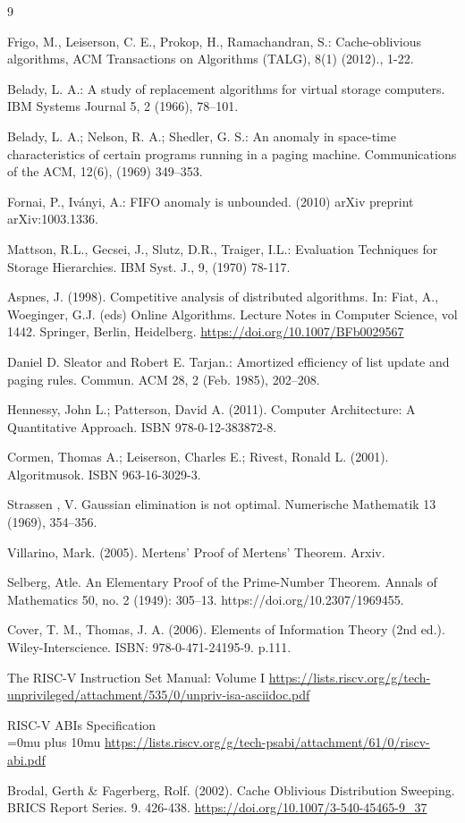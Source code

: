 \documentclass[12pt]{report}
\begin{document}
\begin{thebibliography}{9}

Frigo, M., Leiserson, C. E., Prokop, H., Ramachandran, S.: Cache-oblivious algorithms, ACM Transactions on Algorithms (TALG), 8(1)  (2012)., 1-22.

Belady, L. A.: A study of replacement algorithms for virtual storage computers. IBM Systems Journal 5, 2 (1966), 78–101.

Belady, L. A.; Nelson, R. A.; Shedler, G. S.: An anomaly in space-time characteristics of certain programs running in a paging machine. Communications of the ACM, 12(6), (1969) 349–353. 

Fornai, P., Iványi, A.: FIFO anomaly is unbounded.  (2010) arXiv preprint arXiv:1003.1336.

Mattson, R.L., Gecsei, J., Slutz, D.R., Traiger, I.L.: Evaluation Techniques for Storage Hierarchies. IBM Syst. J., 9, (1970) 78-117.

Aspnes, J. (1998). Competitive analysis of distributed algorithms. In: Fiat, A., Woeginger, G.J. (eds) Online Algorithms. Lecture Notes in Computer Science, vol 1442. Springer, Berlin, Heidelberg. \url{https://doi.org/10.1007/BFb0029567}

Daniel D. Sleator and Robert E. Tarjan.: Amortized efficiency of list update and paging rules. Commun. ACM 28, 2 (Feb. 1985), 202–208.

Hennessy, John L.; Patterson, David A. (2011). Computer Architecture: A Quantitative Approach. ISBN 978-0-12-383872-8.

Cormen, Thomas A.; Leiserson, Charles E.; Rivest, Ronald L. (2001). Algoritmusok. ISBN 963-16-3029-3.

Strassen , V. Gaussian elimination is not optimal. Numerische Mathematik 13
(1969), 354–356.

Villarino, Mark. (2005). Mertens' Proof of Mertens' Theorem. Arxiv.

Selberg, Atle. An Elementary Proof of the Prime-Number Theorem. Annals of Mathematics 50, no. 2 (1949): 305–13. https://doi.org/10.2307/1969455.

Cover, T. M., Thomas, J. A. (2006). Elements of Information Theory (2nd ed.). Wiley-Interscience. ISBN: 978-0-471-24195-9. p.111.

The RISC-V Instruction Set Manual: Volume I
\url{https://lists.riscv.org/g/tech-unprivileged/attachment/535/0/unpriv-isa-asciidoc.pdf}

RISC-V ABIs Specification \\
\Urlmuskip=0mu  plus 10mu
\url{https://lists.riscv.org/g/tech-psabi/attachment/61/0/riscv-abi.pdf}

Brodal, Gerth \& Fagerberg, Rolf. (2002). Cache Oblivious Distribution Sweeping. BRICS Report Series. 9. 426-438. \url{https://doi.org/10.1007/3-540-45465-9_37}

\end{thebibliography}
\end{document}
